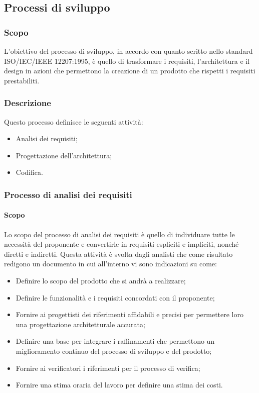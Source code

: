 \subsection{Processi di sviluppo}
\label{_processiDiSviluppo}
\subsubsection{Scopo}

L'obiettivo del processo di sviluppo, in accordo con quanto scritto nello standard ISO/IEC/IEEE 12207:1995, è quello di trasformare i requisiti, l'architettura e il design in azioni che permettono la creazione di un prodotto che rispetti i requisiti prestabiliti.

\subsubsection{Descrizione}
Questo processo definisce le seguenti attività:
\begin{itemize}
  \item Analisi dei requisiti;
  \item Progettazione dell'architettura;
  \item Codifica.
\end{itemize}
\subsubsection{Processo di analisi dei requisiti}
\label{_processoAnalisiDeiRequisiti}
\paragraph{Scopo}
Lo scopo del processo di analisi dei requisiti è quello di individuare tutte le necessità del proponente e convertirle in requisiti espliciti e impliciti, nonché diretti e indiretti. Questa attività è svolta dagli analisti che come risultato redigono un documento in cui all'interno vi sono indicazioni su come:
\begin{itemize}
  \item Definire lo scopo del prodotto che si andrà a realizzare;
  \item Definire le funzionalità e i requisiti concordati con il proponente;
  \item Fornire ai progettisti dei riferimenti affidabili e precisi per permettere loro una progettazione architetturale accurata;
  \item Definire una base per integrare i raffinamenti che permettono un miglioramento continuo del processo di sviluppo e del prodotto;
  \item Fornire ai verificatori i riferimenti per il processo di verifica;
  \item Fornire una stima oraria del lavoro per definire una stima dei costi.
\end{itemize}

